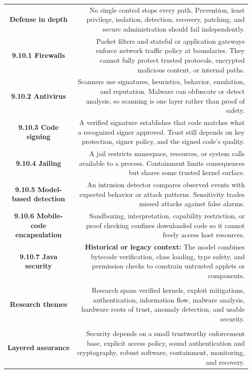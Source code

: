 \documentclass[10pt,letterpaper]{article}
\begin{document}
\begin{longtable}{C N}
\\*\hline
\textbf{Defense in depth} & No single control stops every path. Prevention, least privilege, isolation, detection, recovery, patching, and secure administration should fail independently.\\\hline
\textbf{9.10.1 Firewalls} & Packet filters and stateful or application gateways enforce network traffic policy at boundaries. They cannot fully protect trusted protocols, encrypted malicious content, or internal paths.\\\hline
\textbf{9.10.2 Antivirus} & Scanners use signatures, heuristics, behavior, emulation, and reputation. Malware can obfuscate or detect analysis, so scanning is one layer rather than proof of safety.\\\hline
\textbf{9.10.3 Code signing} & A verified signature establishes that code matches what a recognized signer approved. Trust still depends on key protection, signer policy, and the signed code's quality.\\\hline
\textbf{9.10.4 Jailing} & A jail restricts namespace, resources, or system calls available to a process. Containment limits consequences but shares some trusted kernel surface.\\\hline
\textbf{9.10.5 Model-based detection} & An intrusion detector compares observed events with expected behavior or attack patterns. Sensitivity trades missed attacks against false alarms.\\\hline
\textbf{9.10.6 Mobile-code encapsulation} & Sandboxing, interpretation, capability restriction, or proof checking confines downloaded code so it cannot freely access host resources.\\\hline
\textbf{9.10.7 Java security} & \textcolor{legacy}{\textbf{Historical or legacy context:}} The model combines bytecode verification, class loading, type safety, and permission checks to constrain untrusted applets or components.\\\hline
{}\\*\hline
\textbf{Research themes} & Research spans verified kernels, exploit mitigations, authentication, information flow, malware analysis, hardware roots of trust, anomaly detection, and usable security.\\\hline
{}\\*\hline
\textbf{Layered assurance} & Security depends on a small trustworthy enforcement base, explicit access policy, sound authentication and cryptography, robust software, containment, monitoring, and recovery.\\\hline
\end{longtable}
\normalsize
\end{document}
